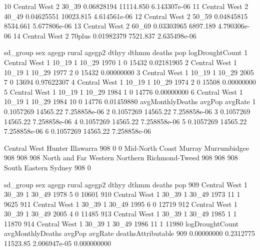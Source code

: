 \documentclass[a4paper]{article}                %
\begin{document}
\begin{Schunk}
\begin{Soutput}
10 Central West   2  30_39       0.06828194 11114.850 6.143307e-06
11 Central West   2  40_49       0.04625551 10023.815 4.614561e-06
12 Central West   2  50_59       0.04845815  8534.661 5.677806e-06
13 Central West   2  60_69       0.03303965  6897.189 4.790306e-06
14 Central West   2 70plus       0.01982379  7521.837 2.635498e-06
\end{Soutput}
\begin{Soutput}
      sd_group sex agegp rural agegp2 dthyy dthmm deaths   pop logDroughtCount
1 Central West   1 10_19     1  10_29  1970     1      0 15432      0.02181905
2 Central West   1 10_19     1  10_29  1977     2      0 15432      0.00000000
3 Central West   1 10_19     1  10_29  2005     7      0 13694      0.97622307
4 Central West   1 10_19     1  10_29  1974     2      0 15508      0.00000000
5 Central West   1 10_19     1  10_29  1984     1      0 14776      0.00000000
6 Central West   1 10_19     1  10_29  1984    10      0 14776      0.01459880
  avgMonthlyDeaths   avgPop      avgRate
1        0.1057269 14565.22 7.258858e-06
2        0.1057269 14565.22 7.258858e-06
3        0.1057269 14565.22 7.258858e-06
4        0.1057269 14565.22 7.258858e-06
5        0.1057269 14565.22 7.258858e-06
6        0.1057269 14565.22 7.258858e-06
\end{Soutput}
\begin{Soutput}
         Central West                Hunter             Illawarra 
                  908                     0                     0 
      Mid-North Coast                Murray          Murrumbidgee 
                  908                   908                   908 
North and Far Western              Northern        Richmond-Tweed 
                  908                   908                   908 
        South Eastern                Sydney 
                  908                     0 
\end{Soutput}
\begin{Soutput}
        sd_group sex agegp rural agegp2 dthyy dthmm deaths   pop
909 Central West   1 30_39     1  30_49  1978     5      0 10601
910 Central West   1 30_39     1  30_49  1973    11      1  9625
911 Central West   1 30_39     1  30_49  1995     6      0 12719
912 Central West   1 30_39     1  30_49  2005     4      0 11485
913 Central West   1 30_39     1  30_49  1985     1      1 11870
914 Central West   1 30_39     1  30_49  1986    11      1 11980
    logDroughtCount avgMonthlyDeaths   avgPop      avgRate deathsAttributable
909      0.00000000        0.2312775 11523.85 2.006947e-05        0.000000000

\end{Soutput}
\end{Schunk}
\end{document}
